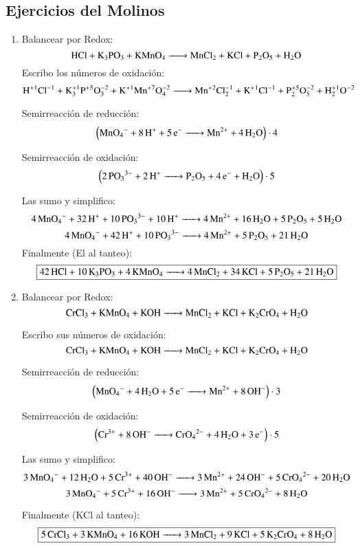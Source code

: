 \subsection{Ejercicios del Molinos}

\begin{enumerate}
\item Balancear por Redox:
$$\ce{
HCl + K3PO3 + KMnO4 ->
MnCl2 + KCl + P2O5 + H2O
}$$
Escribo los números de oxidación:
$$\ce{
H^{+1}Cl^{-1} + K^{+1}3P^{+5}O^{-2}3 + K^{+1}Mn^{+7}O^{-2}4 ->
Mn^{+2}Cl^{-1}2 + K^{+1}Cl^{-1} + P^{+5}2O^{-2}5 + H^{+1}2O^{-2}
}$$


\begin{multicols}{2}
    Semirreacción de reducción:
    $$\left(\ce{
    MnO4^- + 8H^+ + 5e^- ->
    Mn^{2+} + 4H2O
    }\right) \cdot 4$$
    
    Semirreacción de oxidación:
    $$\left(\ce{
    2PO3^{3-} + 2H^+ ->
    P2O5 + 4e^- + H2O
    }\right) \cdot 5$$
\end{multicols}

Las sumo y simplifico:
$$\ce{
4MnO4^- + 32H^+ + 10 PO3^{3-} + 10H^+ ->
4Mn^{2+} + 16H2O + 5P2O5 + 5H2O
}$$
$$\ce{
4MnO4^- + 42H^+ + 10 PO3^{3-} ->
4Mn^{2+} + 5P2O5 + 21H2O
}$$
Finalmente (El  al tanteo):
$$\fbox{\ce{
42HCl + 10K3PO3 + 4KMnO4 ->
4MnCl2 + 34KCl + 5P2O5 + 21H2O
}}$$


\item Balancear por Redox:
$$\ce{
CrCl3 + KMnO4 + KOH ->
MnCl2 + KCl + K2CrO4 + H2O
}$$

Escribo sus números de oxidación:
$$\ce{
CrCl3 + KMnO4 + KOH ->
MnCl2 + KCl + K2CrO4 + H2O
}$$


\begin{multicols}{2}
Semirreacción de reducción:
$$\left(\ce{
MnO4^- + 4H2O + 5e^- ->
Mn^{2+} + 8 OH^{-}
}\right) \cdot 3$$

Semirreacción de oxidación:
$$\left(\ce{
Cr^{3+} + 8OH^- ->
CrO4^{2-} + 4H2O + 3e^-
}\right) \cdot 5$$
\end{multicols}

Las sumo y simplifico:
$$\ce{
3MnO4^- + 12H2O + 5Cr^{3+} + 40OH^- ->
3Mn^{2+} + 24 OH^{-} + 5CrO4^{2-} + 20H2O
}$$
$$\ce{
3MnO4^- + 5Cr^{3+} + 16OH^- ->
3Mn^{2+} + 5CrO4^{2-} + 8H2O
}$$

Finalmente (KCl al tanteo):
$$\fbox{\ce{
5CrCl3 + 3KMnO4 + 16KOH ->
3MnCl2 + 9KCl + 5K2CrO4 + 8H2O
}}$$



\end{enumerate}
